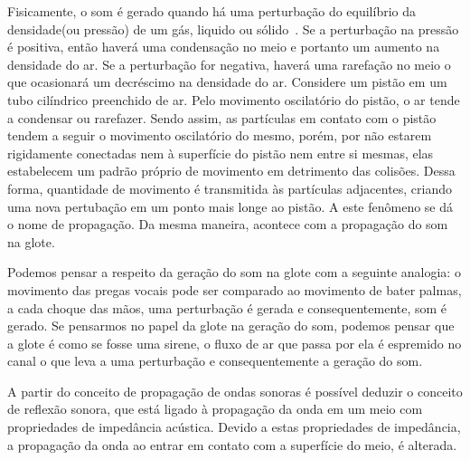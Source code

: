 		Fisicamente, o som é gerado quando há uma perturbação do equilíbrio da densidade(ou pressão) de um gás, liquido ou sólido~\cite{IngoTitze}. Se a perturbação na pressão é positiva, então haverá uma condensação no meio e portanto um aumento na densidade do ar. Se a perturbação for negativa, haverá uma rarefação no meio o que ocasionará um decréscimo na densidade do ar. Considere um pistão em um tubo cilíndrico preenchido de ar. Pelo movimento oscilatório do pistão, o ar tende a condensar ou rarefazer. Sendo assim, as partículas em contato com o pistão tendem a seguir o movimento oscilatório do mesmo, porém, por não estarem rigidamente conectadas nem à superfície do pistão nem entre si mesmas, elas estabelecem um padrão próprio de movimento em detrimento das colisões. Dessa forma, quantidade de movimento é transmitida às partículas adjacentes, criando uma nova pertubação em um ponto mais longe ao pistão. A este fenômeno se dá o nome de propagação. Da mesma maneira, acontece com a propagação do som na glote.
		
		Podemos pensar a respeito da geração do som na glote com a seguinte analogia: o movimento das pregas vocais pode ser comparado ao movimento de bater palmas, a cada choque das mãos, uma perturbação é gerada e consequentemente, som é gerado. Se pensarmos no papel da glote na geração do som, podemos pensar que a glote é como se fosse uma sirene, o ﬂuxo de ar que passa por ela é espremido no canal o que leva a uma perturbação e consequentemente a geração do som.
	
		A partir do conceito de propagação de ondas sonoras é possível deduzir o conceito de reﬂexão sonora, que está ligado à propagação da onda em um meio com propriedades de impedância acústica. Devido a estas propriedades de impedância, a propagação da onda ao entrar em contato com a superfície do meio, é alterada.
		

